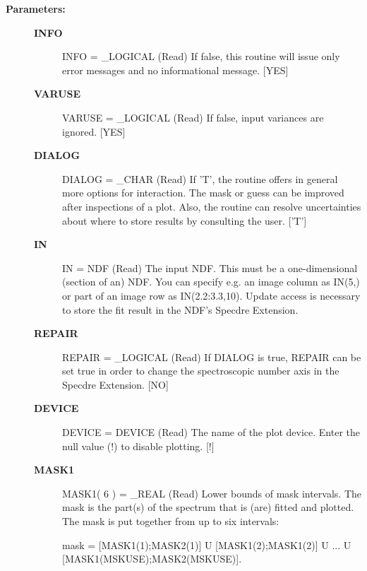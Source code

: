 \begin{description}
\begin{description}
\item [\textbf{Parameters:}]
\begin{description}
\item [\textbf{INFO}]
INFO = \_LOGICAL (Read)
   If false, this routine will issue only error messages and no
   informational message. [YES]
\item [\textbf{VARUSE}]
VARUSE = \_LOGICAL (Read)
   If false, input variances are ignored. [YES]
\item [\textbf{DIALOG}]
DIALOG = \_CHAR (Read)
   If 'T', the routine offers in general more options for
   interaction. The mask or guess can be improved after
   inspections of a plot. Also, the routine can resolve
   uncertainties about where to store results by consulting the
   user. ['T']
\item [\textbf{IN}]
IN = NDF (Read)
   The input NDF. This must be a one-dimensional (section of an)
   NDF. You can specify e.g. an image column as IN(5,) or part of
   an image row as IN(2.2:3.3,10). Update access is necessary to
   store the fit result in the NDF's Specdre Extension.
\item [\textbf{REPAIR}]
REPAIR = \_LOGICAL (Read)
   If DIALOG is true, REPAIR can be set true in order to change
   the spectroscopic number axis in the Specdre Extension. [NO]
\item [\textbf{DEVICE}]
DEVICE = DEVICE (Read)
   The name of the plot device. Enter the null value (!) to
   disable plotting. [!]
\item [\textbf{MASK1}]
MASK1( 6 ) = \_REAL (Read)
   Lower bounds of mask intervals. The mask is the part(s) of the
   spectrum that is (are) fitted and plotted. The mask is put
   together from up to six intervals:

      mask = [MASK1(1);MASK2(1)] U [MASK1(2);MASK1(2)]
           U ...
           U [MASK1(MSKUSE);MASK2(MSKUSE)].


\end{description}
\end{description}
\end{description}

